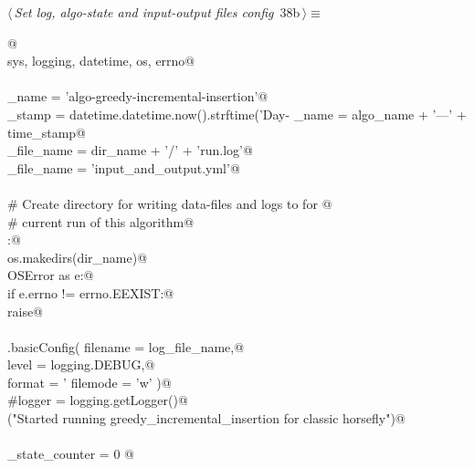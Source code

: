 \documentclass[11.5pt]{report}
\begin{document}
\begin{flushleft} \small\label{scrap46}\raggedright\small
{} $\langle\,${\itshape Set log, algo-state and input-output files config}\nobreak\ {\footnotesize {38b}}$\,\rangle\equiv$
\vspace{-1ex}
\begin{list}{}{} \item
\mbox{}\verb@  @\\
\mbox{}\verb@import sys, logging, datetime, os, errno@\\
\mbox{}\verb@@\\
\mbox{}\verb@algo_name     = 'algo-greedy-incremental-insertion'@\\
\mbox{}\verb@time_stamp    = datetime.datetime.now().strftime('Day-%Y-%m-%d_ClockTime-%H:%M:%S')@\\
\mbox{}\verb@dir_name      = algo_name + '---' + time_stamp@\\
\mbox{}\verb@log_file_name = dir_name + '/' + 'run.log'@\\
\mbox{}\verb@io_file_name  = 'input_and_output.yml'@\\
\mbox{}\verb@@\\
\mbox{}\verb@# Create directory for writing data-files and logs to for @\\
\mbox{}\verb@# current run of this algorithm@\\
\mbox{}\verb@try:@\\
\mbox{}\verb@    os.makedirs(dir_name)@\\
\mbox{}\verb@except OSError as e:@\\
\mbox{}\verb@    if e.errno != errno.EEXIST:@\\
\mbox{}\verb@        raise@\\
\mbox{}\verb@@\\
\mbox{}\verb@logging.basicConfig( filename = log_file_name,@\\
\mbox{}\verb@                     level    = logging.DEBUG,@\\
\mbox{}\verb@                     format   = '%(asctime)s: %(levelname)s: %(message)s',@\\
\mbox{}\verb@                     filemode = 'w' )@\\
\mbox{}\verb@#logger = logging.getLogger()@\\
\mbox{}\verb@info("Started running greedy_incremental_insertion for classic horsefly")@\\
\mbox{}\verb@@\\
\mbox{}\verb@algo_state_counter = 0 @\\

\end{list}
\end{flushleft}
\end{document}
